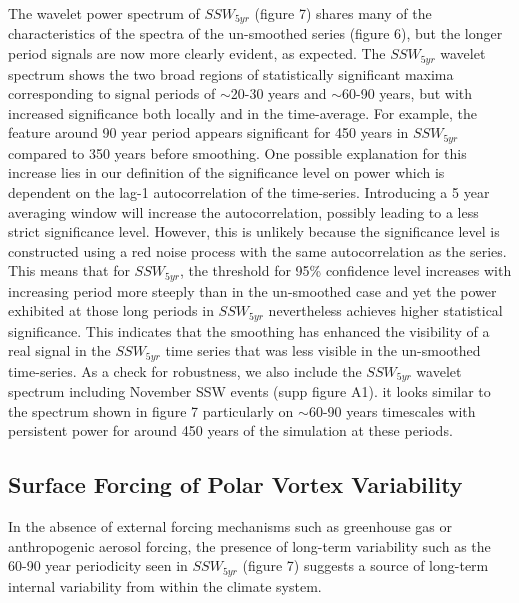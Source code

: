 \documentclass[wcd, manuscript]{copernicus}
\begin{document}
The wavelet power spectrum of $SSW_{5yr}$ (figure 7) shares many of the characteristics of the spectra of the un-smoothed series (figure 6), but the longer period signals are now more clearly evident, as expected. The $SSW_{5yr}$ wavelet spectrum shows the two broad regions of statistically significant maxima corresponding to signal periods of $\sim$20-30 years and $\sim$60-90 years, but with increased significance both locally and in the time-average. For example, the feature around 90 year period appears significant for 450 years in $SSW_{5yr}$ compared to 350 years before smoothing. One possible explanation for this increase lies in our definition of the significance level on power which is dependent on the lag-1 autocorrelation of the time-series. Introducing a 5 year averaging window will increase the autocorrelation, possibly leading to a less strict significance level. However, this is unlikely because the significance level is constructed using a red noise process with the same autocorrelation as the series. This means that for $SSW_{5yr}$, the threshold for 95\% confidence level increases with increasing period more steeply than in the un-smoothed case and yet the power exhibited at those long periods in $SSW_{5yr}$ nevertheless achieves higher statistical significance. This indicates that the smoothing has enhanced the visibility of a real signal in the $SSW_{5yr}$ time series that was less visible in the un-smoothed time-series. As a check for robustness, we also include the $SSW_{5yr}$ wavelet spectrum including November SSW events (supp figure A1). it looks similar to  the spectrum shown in figure 7 particularly on $\sim$60-90 years timescales with persistent power for around 450 years of the simulation at these periods.  


\subsection{Surface Forcing of Polar Vortex Variability}
In the absence of external forcing mechanisms such as greenhouse gas or anthropogenic aerosol forcing, the presence of long-term variability such as the 60-90 year periodicity seen in $SSW_{5yr}$ (figure 7) suggests a source of long-term internal variability from within the climate system. 
\end{document}
